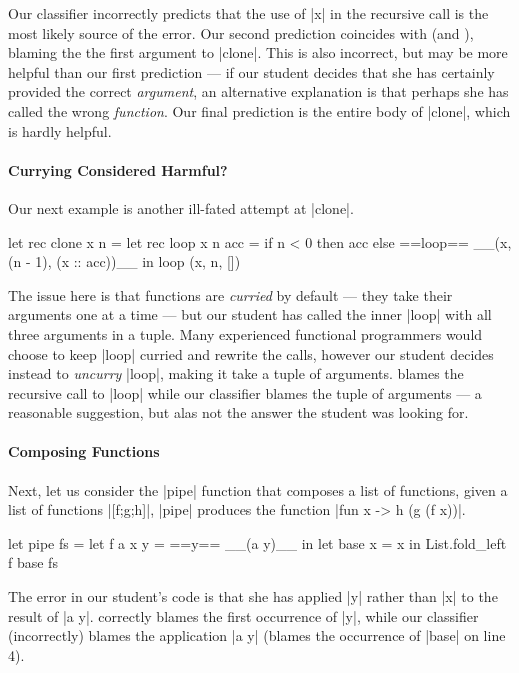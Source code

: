 Our classifier incorrectly predicts that the use of |x| in the recursive
call is the most likely source of the error.
%
Our second prediction coincides with \sherrloc (and \ocaml), blaming the
the first argument to |clone|.
%
This is also incorrect, but may be more helpful than our first
prediction --- if our student decides that she has certainly provided
the correct \emph{argument}, an alternative explanation is that
perhaps she has called the wrong \emph{function}.
%
Our final prediction is the entire body of |clone|, which is hardly
helpful.

\paragraph{Currying Considered Harmful?}
Our next example is another ill-fated attempt at |clone|.
%
\begin{ecode}
  let rec clone x n =
    let rec loop x n acc =
      if n < 0 then
        acc
      else
        ==loop== __(x, (n - 1), (x :: acc))__ in
    loop (x, n, [])
\end{ecode}
The issue here is that \ocaml functions are \emph{curried} by default
--- \ie they take their arguments one at a time --- but our student has
called the inner |loop| with all three arguments in a tuple.
%
Many experienced functional programmers would choose to keep |loop|
curried and rewrite the calls, however our student decides instead to
\emph{uncurry} |loop|, making it take a tuple of arguments.
%
\sherrloc blames the recursive call to |loop| while our classifier
blames the tuple of arguments --- a reasonable suggestion, but alas not
the answer the student was looking for.
%

\paragraph{Composing Functions}
Next, let us consider the |pipe| function that composes a list of
functions, \ie given a list of functions |[f;g;h]|, |pipe| produces the
function |fun x -> h (g (f x))|.
%
\begin{ecode}
  let pipe fs =
    let f a x y = ==y== __(a y)__ in
    let base x = x in
    List.fold_left f base fs
\end{ecode}
%
The error in our student's code is that she has applied |y| rather than
|x| to the result of |a y|.
%
\sherrloc correctly blames the first occurrence of |y|, while our
classifier (incorrectly) blames the application |a y| (\ocaml blames
the occurrence of |base| on line 4).
%



